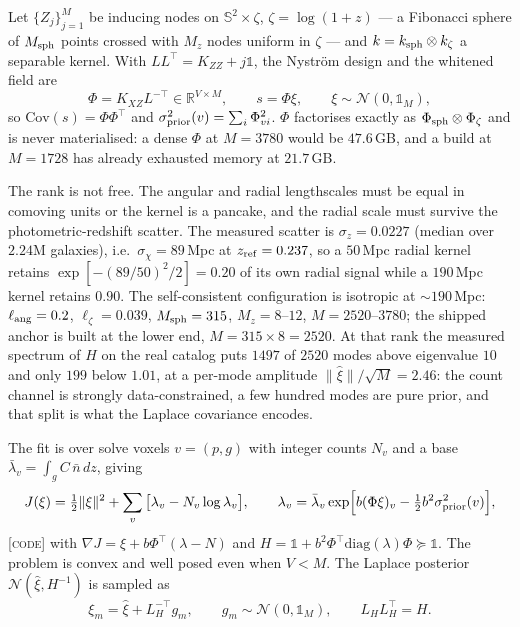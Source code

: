 \documentclass[11pt]{article}
\theoremstyle{definition}
\theoremstyle{remark}
\newcommand{\nbar}{\bar n}
\newcommand{\Msph}{M_{\rm sph}}
\newcommand{\Mz}{M_{z}}
\begin{document}
Let $\{Z_j\}_{j=1}^M$ be inducing nodes on $\mathbb S^2\times\zeta$,
$\zeta=\log(1+z)$ --- a Fibonacci sphere of $\Msph$ points crossed with $\Mz$ nodes
uniform in $\zeta$ --- and $k=k_{\rm sph}\otimes k_\zeta$ a separable kernel. With
$LL^{\!\top}=K_{ZZ}+j\mathbb 1$, the Nystr\"om design and the whitened field are
\begin{equation}
  \Phi=K_{XZ}L^{-\!\top}\in\mathbb R^{V\times M},
  \qquad s=\Phi\xi,\qquad \xi\sim\mathcal N(0,\mathbb 1_M),
  \label{eq:lowrank}
\end{equation}
so $\mathrm{Cov}(s)=\Phi\Phi^{\!\top}$ and $\sigma^2_{\rm prior}(v)=\sum_i\Phi_{vi}^2$.
$\Phi$ factorises exactly as $\Phi_{\rm sph}\otimes\Phi_\zeta$ and is never
materialised: a dense $\Phi$ at $M=3780$ would be $47.6$\,GB, and a build at
$M=1728$ has already exhausted memory at $21.7$\,GB.

The rank is not free. The angular and radial lengthscales must be equal in
comoving units or the kernel is a pancake, and the radial scale must survive the
photometric-redshift scatter. The measured scatter is $\sigma_z=0.0227$ (median
over $2.24$M galaxies), i.e.\ $\sigma_\chi=89$\,Mpc at $z_{\rm ref}=0.237$, so a
$50$\,Mpc radial kernel retains $\exp[-(89/50)^2/2]=0.20$ of its own radial signal
while a $190$\,Mpc kernel retains $0.90$. The self-consistent configuration is
isotropic at $\sim190$\,Mpc: $\ell_{\rm ang}=0.2$, $\ell_\zeta=0.039$, $\Msph=315$,
$\Mz=8$--$12$, $M=2520$--$3780$; the shipped anchor is built at the lower end,
$M=315\times8=2520$. At that rank the measured spectrum of $H$ on the real
catalog puts $1497$ of $2520$ modes above eigenvalue $10$ and only $199$ below
$1.01$, at a per-mode amplitude $\|\hat\xi\|/\sqrt M=2.46$: the count channel is
strongly data-constrained, a few hundred modes are pure prior, and that split is
what the Laplace covariance encodes.

The fit is over solve voxels $v=(p,g)$ with integer counts $N_v$ and a base
$\bar\lambda_v=\int_g C\,\nbar\,dz$, giving
\begin{equation}
  J(\xi)=\tfrac12\|\xi\|^2+\sum_v\big[\lambda_v-N_v\log\lambda_v\big],
  \qquad
  \lambda_v=\bar\lambda_v\exp\!\Big[b(\Phi\xi)_v-\tfrac12b^2\sigma^2_{\rm prior}(v)\Big],
  \label{eq:Jpoisson}
\end{equation}
\textsc{[code]} with $\nabla J=\xi+b\Phi^{\!\top}(\lambda-N)$ and
$H=\mathbb 1+b^2\Phi^{\!\top}\mathrm{diag}(\lambda)\Phi\succeq\mathbb 1$. The problem
is convex and well posed even when $V<M$. The Laplace posterior
$\mathcal N(\hat\xi,H^{-1})$ is sampled as
\begin{equation}
  \xi_m=\hat\xi+L_H^{-\!\top}g_m,\qquad g_m\sim\mathcal N(0,\mathbb 1_M),
  \qquad L_HL_H^{\!\top}=H .
  \label{eq:laplacedraws}
\end{equation}
\end{document}
